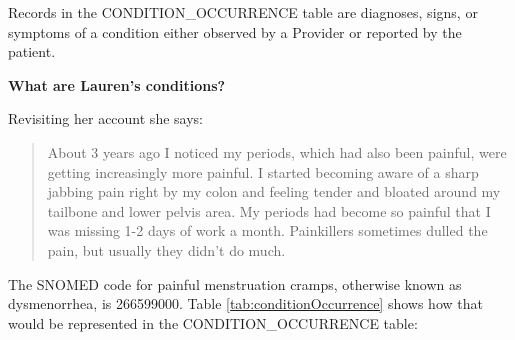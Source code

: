\documentclass[11pt]{book}
\theoremstyle{definition}
\theoremstyle{definition}
\theoremstyle{definition}
\theoremstyle{remark}
\begin{document}
Records in the CONDITION\_OCCURRENCE table are diagnoses, signs, or symptoms of a condition either observed by a Provider or reported by the patient.

\textbf{What are Lauren's conditions?}

Revisiting her account she says:

\begin{quote}
About 3 years ago I noticed my periods, which had also been painful, were getting increasingly more painful. I started becoming aware of a sharp jabbing pain right by my colon and feeling tender and bloated around my tailbone and lower pelvis area. My periods had become so painful that I was missing 1-2 days of work a month. Painkillers sometimes dulled the pain, but usually they didn't do much.
\end{quote}

The SNOMED code for painful menstruation cramps, otherwise known as dysmenorrhea, is 266599000. Table \ref{tab:conditionOccurrence} shows how that would be represented in the CONDITION\_OCCURRENCE table:
\end{document}
